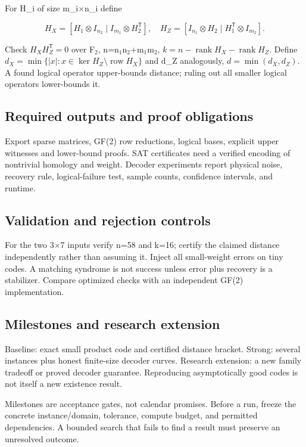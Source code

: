 \documentclass[
  11pt,
]{article}
\begin{document}
For H\_i of size m\_i\ensuremath{\times}n\_i define

\[H_X=[H_1\otimes I_{n_2}\mid I_{m_1}\otimes H_2^{\mathsf T}],\quad H_Z=[I_{n_1}\otimes H_2\mid H_1^{\mathsf T}\otimes I_{m_2}].\]

Check \(H_XH_Z^{\mathsf T}=0\) over F\ensuremath{{}_{2}},
n=n\ensuremath{{}_{1}}n\ensuremath{{}_{2}}+m\ensuremath{{}_{1}}m\ensuremath{{}_{2}},
\(k=n-\operatorname{rank}H_X-\operatorname{rank}H_Z\). Define
\(d_X=\min\{|x|:x\in\ker H_Z\setminus\operatorname{row}H_X\}\) and d\_Z
analogously, \(d=\min(d_X,d_Z)\). A found logical operator upper-bounds
distance; ruling out all smaller logical operators lower-bounds it.

\subsection{Required outputs and proof obligations}

Export sparse matrices, GF(2) row reductions, logical bases, explicit
upper witnesses and lower-bound proofs. SAT certificates need a verified
encoding of nontrivial homology and weight. Decoder experiments report
physical noise, recovery rule, logical-failure test, sample counts,
confidence intervals, and runtime.

\subsection{Validation and rejection controls}

For the two 3\ensuremath{\times}7 inputs verify n=58 and k=16; certify
the claimed distance independently rather than assuming it. Inject all
small-weight errors on tiny codes. A matching syndrome is not success
unless error plus recovery is a stabilizer. Compare optimized checks
with an independent GF(2) implementation.

\subsection{Milestones and research extension}

Baseline: exact small product code and certified distance bracket.
Strong: several instances plus honest finite-size decoder curves.
Research extension: a new family tradeoff or proved decoder guarantee.
Reproducing asymptotically good codes is not itself a new existence
result.

Milestones are acceptance gates, not calendar promises. Before a run,
freeze the concrete instance/domain, tolerance, compute budget, and
permitted dependencies. A bounded search that fails to find a result
must preserve an unresolved outcome.
\end{document}
